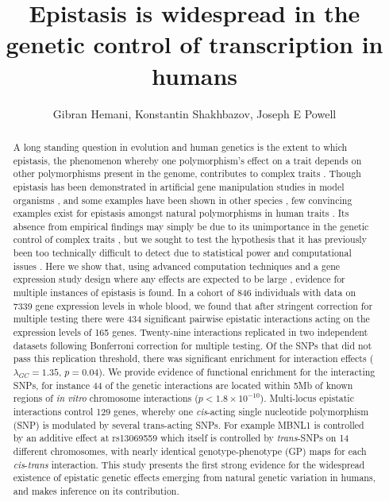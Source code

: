 \documentclass{article}
\title{Epistasis is widespread in the genetic control of transcription in humans}
\date{}
\author{Gibran Hemani, Konstantin Shakhbazov, Joseph E Powell}
\begin{document}
\maketitle


\begin{abstract}
A long standing question in evolution and human genetics is the extent to which epistasis, the phenomenon whereby one polymorphism's effect on a trait depends on other polymorphisms present in the genome, contributes to complex traits \cite{Carlborg2004, Hill2008a, Crow2010}. Though epistasis has been demonstrated in artificial gene manipulation studies in model organisms \cite{Costanzo2010, Bloom2013}, and some examples have been shown in other species \cite{Carlborg2006}, few convincing examples exist for epistasis amongst natural polymorphisms in human traits \cite{Strange2010, Evans2011}. Its absence from empirical findings may simply be due to its unimportance in the genetic control of complex traits \cite{Hill2008a, Crow2010}, but we sought to test the hypothesis that it has previously been too technically difficult to detect due to statistical power and computational issues \cite{Cordell2009}. Here we show that, using advanced computation techniques \cite{Hemani2011} and a gene expression study design where any effects are expected to be large \cite{Powell2012}, evidence for multiple instances of epistasis is found. In a cohort of 846 individuals with data on 7339 gene expression levels in whole blood, we found that after stringent correction for multiple testing there were 434 significant pairwise epistatic interactions acting on the expression levels of 165 genes. Twenty-nine interactions replicated in two independent datasets \cite{Metspalu2004, Fehrmann2011} following Bonferroni correction for multiple testing. Of the SNPs that did not pass this replication threshold, there was significant enrichment for interaction effects ($\lambda_{GC} = 1.35$, $p = 0.04$). We provide evidence of functional enrichment for the interacting SNPs, for instance 44 of the genetic interactions are located within 5Mb of known regions of \emph{in vitro} chromosome interactions \cite{LiebermanAiden2009} ($p < 1.8 \times 10^{-10}$). Multi-locus epistatic interactions control 129 genes, whereby one \emph{cis}-acting single nucleotide polymorphism (SNP) is modulated by several trans-acting SNPs. For example MBNL1 is controlled by an additive effect at rs13069559 which itself is controlled by \emph{trans}-SNPs on 14 different chromosomes, with nearly identical genotype-phenotype (GP) maps for each \emph{cis}-\emph{trans} interaction. This study presents the first strong evidence for the widespread existence of epistatic genetic effects emerging from natural genetic variation in humans, and makes inference on its contribution.
\end{abstract}
\end{document}

